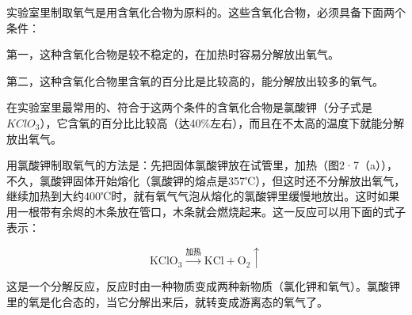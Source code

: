 实验室里制取氧气是用含氧化合物为原料的。这些含氧化合物，必须具备下面两个条件：

第一，这种含氧化合物是较不稳定的，在加热时容易分解放出氧气。

第二，这种含氧化合物里含氧的百分比是比较高的，能分解放出较多的氧气。

在实验室里最常用的、符合于这两个条件的含氧化合物是氯酸钾（分子式是
\(KClO_{3}\)），它含氧的百分比比较高（达40\%左右），而且在不太高的温度下就能分解放出氧气。

用氯酸钾制取氧气的方法是：先把固体氯酸钾放在试管里，加热（图2·7（a）），不久，氯酸钾固体开始熔化（氯酸钾的熔点是357℃），但这时还不分解放出氧气，继续加热到大约400℃时，就有氧气气泡从熔化的氯酸钾里缓慢地放出。这时如果用一根带有余烬的木条放在管口，木条就会燃烧起来。这一反应可以用下面的式子表示：

\[
\mathrm{KClO}_{3}\xrightarrow{\text{加热}}\mathrm{KCl}+\mathrm{O}_{2}\uparrow
\]

这是一个分解反应，反应时由一种物质变成两种新物质（氯化钾和氧气）。氯酸钾里的氧是化合态的，当它分解出来后，就转变成游离态的氧气了。

